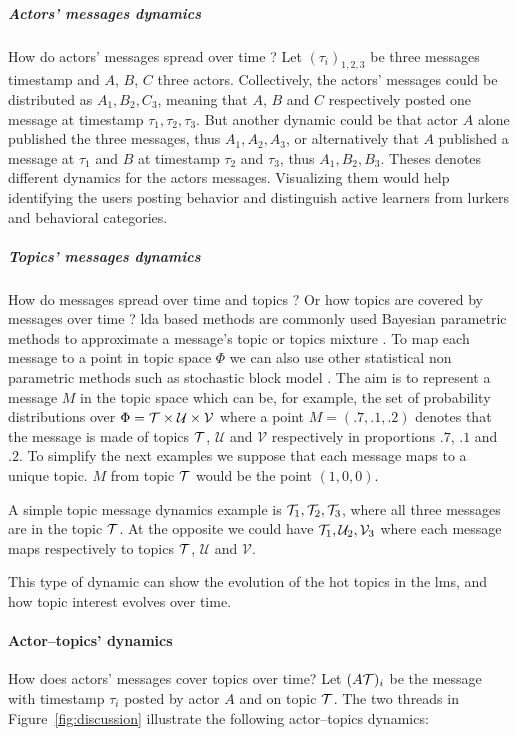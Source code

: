 \documentclass[a4paper,twoside]{article}
\newcommand{\V}{\mathcal{V}}
\newcommand{\U}{\mathcal{U}}
\begin{document}
\subparagraph{Actors' messages dynamics}
How do actors' messages spread over time ?  Let $(\tau_i)_{1, 2, 3}$ be three messages timestamp and $A$, $B$, $C$ three actors.  Collectively, the actors' messages could be distributed as $A_1, B_2,C_3$, meaning that $A$, $B$  and $C$ respectively posted one message at timestamp $\tau_1, \tau_2, \tau_3$.  But another dynamic could be that actor $A$ alone published the three messages, thus $A_1, A_2, A_3$,  or alternatively that $A$ published a message at $\tau_1$ and $B$ at timestamp $\tau_2$ and $\tau_3$, thus $A_1, B_2, B_3$.  Theses denotes different dynamics for the actors messages.  Visualizing them would help identifying the users posting behavior and distinguish active learners from lurkers and behavioral categories.


\subparagraph{Topics' messages dynamics}
How do messages spread over time and topics ?  Or how topics are covered by messages over time ?
\gls{lda} based methods are commonly used Bayesian parametric methods to approximate a message's topic or topics mixture \citep{Jelodar2017}.  To map each message to a point in topic space $\Phi$ we can also use other statistical non parametric methods such as stochastic block model \citep{Gerlach2018}.   The aim is to represent a message $M$ in the topic space which can be, for example, the set of probability distributions over $\Phi = \T\times \U \times \V$ where a point $M = (.7, .1, .2)$ denotes that the message is made of topics $\mathcal{T}$, $\U$ and $\V$ respectively in proportions $.7$, $.1$ and $.2$.  To simplify the next examples we suppose that each message maps to a unique topic. $M$ from topic $\mathcal{T}$ would be the point $(1, 0, 0)$.

A simple topic message dynamics example is  $\mathcal{T}_1, \mathcal{T}_2, \mathcal{T}_3$,  where all three messages are in the topic $\mathcal{T}$.  At the opposite we could have $\T_1, \U_2, \V_3$ where each message maps respectively to topics $\mathcal{T}$, $\U$ and $\V$.

This type of dynamic can show the evolution of the hot topics in the \gls{lms}, and how topic interest evolves over time.


\paragraph{Actor--topics' dynamics}
How does actors' messages cover topics over time?  Let $(A\mathcal{T})_i$ be the message with timestamp $\tau_i$ posted by actor $A$ and on topic $\mathcal{T}$.  The two threads in Figure~\ref{fig:discussion} illustrate the following actor--topics dynamics:
\end{document}
